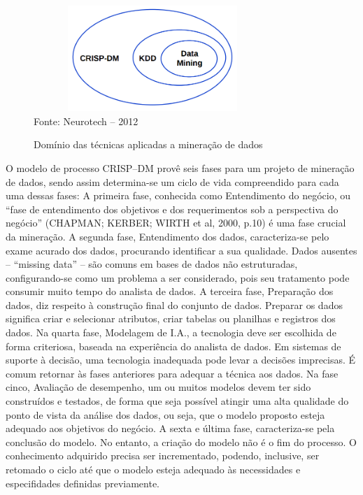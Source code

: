 \documentclass[conference,compsoc]{IEEEtran}
\begin{document}
\begin{figure}[!ht]
\centering
\caption{Domínio das técnicas aplicadas a mineração de dados}
\vspace{1mm}
\includegraphics[width=90mm, height=40mm]{Figuras/RelacaoCrispKddDm.png}\\
\tiny Fonte: Neurotech -- 2012
\end{figure}

O modelo de processo CRISP–DM provê seis fases para um projeto de
mineração de dados, sendo assim determina-se um ciclo de vida
compreendido para cada uma dessas fases:
A primeira fase, conhecida como Entendimento do negócio, ou “fase
de entendimento dos objetivos e dos requerimentos sob a perspectiva
do negócio” (CHAPMAN; KERBER; WIRTH et al, 2000, p.10) é
uma fase crucial da mineração.
A segunda fase, Entendimento dos dados, caracteriza-se pelo exame
acurado dos dados, procurando identificar a sua qualidade. Dados
ausentes – “missing data” – são comuns em bases de dados não
estruturadas, configurando-se como um problema a ser considerado,
pois seu tratamento pode consumir muito tempo do analista de dados.
A terceira fase, Preparação dos dados, diz respeito à construção final
do conjunto de dados. Preparar os dados significa criar e selecionar
atributos, criar tabelas ou planilhas e registros dos dados.
Na quarta fase, Modelagem de I.A., a tecnologia deve ser escolhida de
forma criteriosa, baseada na experiência do analista de dados. Em
sistemas de suporte à decisão, uma tecnologia inadequada pode levar a
decisões imprecisas. É comum retornar às fases anteriores para
adequar a técnica aos dados.
Na fase cinco, Avaliação de desempenho, um ou muitos modelos
devem ter sido construídos e testados, de forma que seja possível
atingir uma alta qualidade do ponto de vista da análise dos dados, ou
seja, que o modelo proposto esteja adequado aos objetivos do
negócio.
A sexta e última fase, caracteriza-se pela conclusão do modelo. No
entanto, a criação do modelo não é o fim do processo. O conhecimento
adquirido precisa ser incrementado, podendo, inclusive, ser retomado
o ciclo até que o modelo esteja adequado às necessidades e
especifidades definidas previamente.
\end{document}
